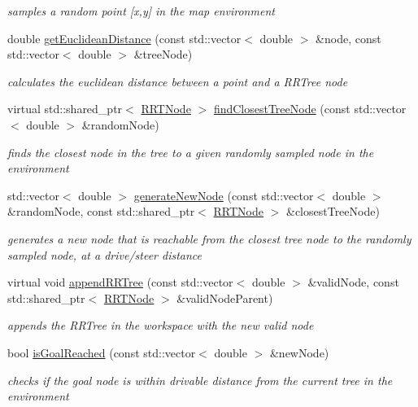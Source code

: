 \begin{DoxyCompactItemize}
\begin{DoxyCompactList}\small\item\em samples a random point \mbox{[}x,y\mbox{]} in the map environment \end{DoxyCompactList}\item 
double \hyperlink{classRRT_a71746e00550593ba81eff895a736bc83}{get\+Euclidean\+Distance} (const std\+::vector$<$ double $>$ \&node, const std\+::vector$<$ double $>$ \&tree\+Node)
\begin{DoxyCompactList}\small\item\em calculates the euclidean distance between a point and a R\+R\+Tree node \end{DoxyCompactList}\item 
virtual std\+::shared\+\_\+ptr$<$ \hyperlink{classRRTNode}{R\+R\+T\+Node} $>$ \hyperlink{classRRT_ae581ca8e7858e75e3958596f9dd57390}{find\+Closest\+Tree\+Node} (const std\+::vector$<$ double $>$ \&random\+Node)
\begin{DoxyCompactList}\small\item\em finds the closest node in the tree to a given randomly sampled node in the environment \end{DoxyCompactList}\item 
std\+::vector$<$ double $>$ \hyperlink{classRRT_a819276861e55d3c472c19dd92f4e6d58}{generate\+New\+Node} (const std\+::vector$<$ double $>$ \&random\+Node, const std\+::shared\+\_\+ptr$<$ \hyperlink{classRRTNode}{R\+R\+T\+Node} $>$ \&closest\+Tree\+Node)
\begin{DoxyCompactList}\small\item\em generates a new node that is reachable from the closest tree node to the randomly sampled node, at a drive/steer distance \end{DoxyCompactList}\item 
virtual void \hyperlink{classRRT_a2629b145454f54cca6a1ad796c27e900}{append\+R\+R\+Tree} (const std\+::vector$<$ double $>$ \&valid\+Node, const std\+::shared\+\_\+ptr$<$ \hyperlink{classRRTNode}{R\+R\+T\+Node} $>$ \&valid\+Node\+Parent)
\begin{DoxyCompactList}\small\item\em appends the R\+R\+Tree in the workspace with the new valid node \end{DoxyCompactList}\item 
bool \hyperlink{classRRT_ae952a5270a03a0dfe49ca110a6a430b7}{is\+Goal\+Reached} (const std\+::vector$<$ double $>$ \&new\+Node)
\begin{DoxyCompactList}\small\item\em checks if the goal node is within drivable distance from the current tree in the environment \end{DoxyCompactList}\item 

\end{DoxyCompactItemize}
